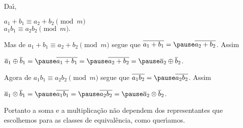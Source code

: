 \documentclass{beamer}
\begin{document}
    \begin{frame}
        \pause
        Da{\'\i},
        \begin{center}
            $a_1 + b_1 \equiv a_2 + b_2 \pmod m$\pause\\
            $a_1b_1 \equiv a_2b_2 \pmod m.$\pause\\
        \end{center}

        Mas de $a_1 + b_1 \equiv a_2 + b_2 \pmod m$ \pause segue que $\overline{a_1 + b_1} =  \pause \overline{a_2 + b_2}$. \pause Assim
        \begin{center}
            $\overline{a}_{1}\oplus \overline{b}_{1} = \pause \overline{a_{1}+b_{1}} = \pause \overline{a_{2} + b_{2}} = \pause \overline{a}_{2}\oplus \overline{b}_{2}$.\pause
        \end{center}

        Agora de $a_1b_1 \equiv a_2b_2 \pmod m$ \pause segue que $\overline{a_1b_2} = \pause \overline{a_2b_2}$. \pause Assim
        \begin{center}
            $\overline{a}_{1}\otimes \overline{b}_{1} = \pause \overline{a_{1}b_{1}} = \pause \overline{a_{2}b_{2}} = \pause \overline{a}_{2}\otimes\overline{b}_{2}$.\pause
        \end{center}

        Portanto a soma e a multiplica\c{c}\~ao \pause n\~ao dependem dos representantes que escolhemos para as classes de equival\^encia, \pause como quer{\'\i}amos.\hspace{.3cm} \qedsymbol
    \end{frame}
\end{document}
